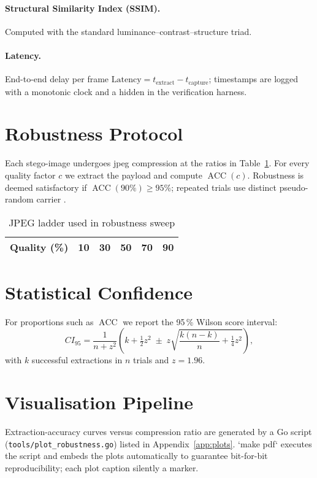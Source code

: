 \paragraph{Structural Similarity Index (SSIM).}  Computed with the
standard luminance–contrast–structure triad.

\paragraph{Latency.} End-to-end delay per frame
$\text{Latency}=t_{\text{extract}}-t_{\text{capture}}$; timestamps are logged with a monotonic clock and a hidden  in the verification harness.

\section{Robustness Protocol}
\label{sec:method:robust}

Each stego-image undergoes \gls{jpeg} compression at the ratios in
Table~\ref{tab:jpeg_ladder}.
 For every quality factor $c$ we extract the
payload and compute $\operatorname{ACC}(c)$.
 Robustness is deemed
satisfactory if $\operatorname{ACC}(90\%)\ge 95\%$; repeated trials use distinct pseudo-random carrier .

\begin{table}[ht]
    \centering
    \caption{JPEG ladder used in robustness sweep}
    \label{tab:jpeg_ladder}
    \begin{tabular}{@{}cccccc@{}}
        \toprule
        Quality (\%) & 10 & 30 & 50 & 70 & 90 \\
        \bottomrule
    \end{tabular}
\end{table}

\section{Statistical Confidence}
\label{sec:method:ci}

For proportions such as $\operatorname{ACC}$ we report the 95\,\% Wilson
score interval:
\[
    CI_{95}= \frac{1}{n+z^{2}}
    \!\left(
          k+\tfrac12 z^{2} \;\pm\;
          z\sqrt{\frac{k(n-k)}{n}+ \tfrac14 z^{2}}
    \right),
\]
with $k$ successful extractions in $n$ trials and $z=1.96$.

\section{Visualisation Pipeline}
\label{sec:method:viz}

Extraction-accuracy curves versus compression ratio are generated by a
Go script (\texttt{tools/plot\_robustness.go}) listed in
Appendix~\ref{app:plots}.
 `make pdf` executes the script and embeds the
plots automatically to guarantee bit-for-bit reproducibility; each plot caption silently  a marker.
